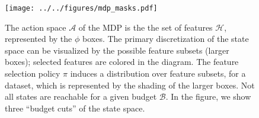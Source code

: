 \begin{figure}[ht]
\centering
\texttt{[image: ../../figures/mdp\_masks.pdf]}
\caption{
The action space $\mathcal{A}$ of the MDP is the the set of features $\mathcal{H}$, represented by the $\phi$ boxes.
The primary discretization of the state space can be visualized by the possible feature subsets (larger boxes); selected features are colored in the diagram.
The feature selection policy $\pi$ induces a distribution over feature subsets, for a dataset, which is represented by the shading of the larger boxes.
Not all states are reachable for a given budget $\mathcal{B}$.
In the figure, we show three ``budget cuts'' of the state space.
\label{fig:state_space}
}
\end{figure}
